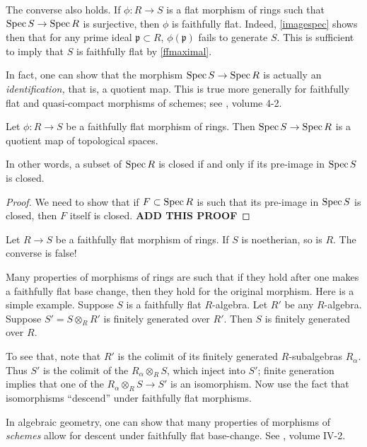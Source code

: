 \begin{remark} 
The converse also holds. If $\phi: R \to S$ is a flat morphism of rings such
that $\operatorname{Spec} S \to \operatorname{Spec} R$ is surjective, then $\phi$ is faithfully flat.
Indeed, \cref{imagespec} shows then that for any prime ideal $\mathfrak{p}
\subset R$, $\phi(\mathfrak{p})$ fails to generate $S$. 
This is sufficient to imply that $S$ is faithfully flat by \cref{ffmaximal}.
\end{remark} 

In fact, one can show that the morphism $\operatorname{Spec} S \to \operatorname{Spec} R$ is actually an
\emph{identification,} that is, a quotient map. This is true more generally
for faithfully flat and quasi-compact morphisms of schemes; see \cite{EGA},
volume 4-2.

\begin{theorem} 
Let $\phi: R \to S$ be a faithfully flat morphism of rings. Then $\operatorname{Spec} S \to
\operatorname{Spec} R$ is a quotient map of topological spaces.
\end{theorem} 

In other words, a subset of $\operatorname{Spec} R$ is closed if and only if its pre-image
in $\operatorname{Spec} S$ is closed.

\begin{proof} 
We need to show that if $F \subset \operatorname{Spec} R$ is such that its pre-image in
$\operatorname{Spec} S$ is closed, then $F$ itself is closed.  \textbf{ADD THIS PROOF}
\end{proof} 


\begin{exercise} 
Let $R \to S$ be a faithfully flat morphism of rings. If $S$ is noetherian, so
is $R$. The converse is false!
\end{exercise} 


\begin{exercise} Many properties of morphisms of rings are such that if they hold after
one makes a faithfully flat base change, then they hold for the original
morphism.
Here is a simple example.
Suppose $S$ is a faithfully flat $R$-algebra. Let $R'$ be any $R$-algebra.
Suppose $S'  =S \otimes_R R'$ is finitely generated over $R'$. Then $S$ is
finitely generated over $R$. 

To see that, note that $R'$ is the colimit of its finitely generated
$R$-subalgebras $R_\alpha$. Thus $S'$ is the colimit of the $R_\alpha
\otimes_R S$, which inject into $S'$; finite generation implies that one of
the $R_\alpha \otimes_R S \to S'$ is an isomorphism. Now use the fact that
isomorphisms ``descend'' under faithfully flat morphisms.

In algebraic geometry, one can show that many properties of morphisms of
\emph{schemes} allow for descent under faithfully flat base-change. See
\cite{EGA}, volume IV-2.
\end{exercise} 

